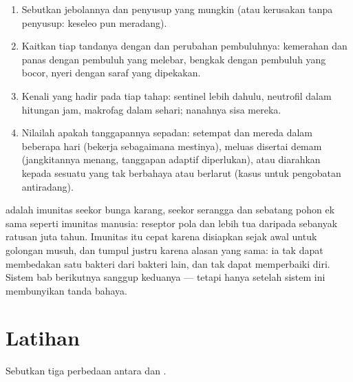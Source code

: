 \begin{method}\label{met:g12:innate-immunity:read}
\begin{enumerate}
  \item Sebutkan jebolannya dan penyusup yang mungkin (atau kerusakan
        tanpa penyusup: keseleo pun meradang).
  \item Kaitkan tiap tandanya dengan  dan perubahan
        pembuluhnya: kemerahan dan panas dengan pembuluh yang melebar,
        bengkak dengan pembuluh yang bocor, nyeri dengan saraf yang
        dipekakan.
  \item Kenali  yang hadir pada tiap tahap: sentinel lebih dahulu,
        neutrofil dalam hitungan jam, makrofag dalam sehari; nanahnya
        sisa mereka.
  \item Nilailah apakah tanggapannya sepadan: setempat dan mereda dalam
        beberapa hari (bekerja sebagaimana mestinya), meluas disertai
        demam (jangkitannya menang, tanggapan adaptif diperlukan), atau
        diarahkan kepada sesuatu yang tak berbahaya atau berlarut
        (kasus untuk pengobatan antiradang).
\end{enumerate}
\end{method}

\begin{remark}\label{rem:g12:innate-immunity:old}
 adalah imunitas seekor bunga karang, seekor serangga
dan sebatang pohon ek sama seperti imunitas manusia: reseptor pola dan
 lebih tua daripada  sebanyak ratusan juta tahun.
Imunitas itu cepat karena disiapkan sejak awal untuk golongan musuh,
dan tumpul justru karena alasan yang sama: ia tak dapat membedakan
satu bakteri dari bakteri lain, dan tak dapat memperbaiki diri. Sistem
bab berikutnya sanggup keduanya --- tetapi hanya setelah sistem ini
membunyikan tanda bahaya.
\end{remark}

\section{Latihan}

\begin{exercise}[$\star$]\label{exo:g12:innate-immunity:1}
Sebutkan tiga perbedaan antara  dan .
\end{exercise}

